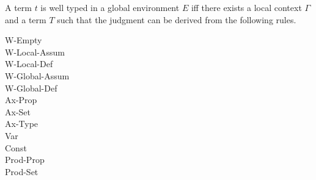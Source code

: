 A term $t$ is well typed in a global environment $E$ iff there exists a
local context $\Gamma$ and a term $T$ such that the judgment  can
be derived from the following rules.
\begin{description}
\item[W-Empty] \inference{\WF{[]}{}}
\item[W-Local-Assum]  %
\item[W-Local-Def]
\item[W-Global-Assum] 
\item[W-Global-Def] 
\item[Ax-Prop] 
\item[Ax-Set] 
\item[Ax-Type] 
\item[Var]
\item[Const]  
\item[Prod-Prop]  
\item[Prod-Set]  

\end{description}
